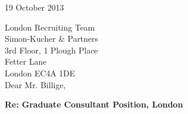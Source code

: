 \documentclass{../res}
\begin{document}
 
\begin{sloppypar}
 
 


\address{2115 Cloville Avenue\\
         Baltimore, MD 21214\\
         +1 443 257 5953}
\address{ryan.m.harrison@gmail.com\\
         linkedin.com/in/rmharri\\
         github.com/rmharrison}
\address{Wolfson College\\ 
         Oxford OX2 6UD\\
         +44 (0) 7523 229446}

\begin{resume} 
 
\vspace{2\baselineskip}

19 October 2013
\vspace{1\baselineskip}

London Recruiting Team \\
Simon-Kucher \& Partners \\
3rd Floor, 1 Plough Place \\
Fetter Lane \\
London EC4A 1DE \\

Dear Mr. Billige,

\textbf{Re: Graduate Consultant Position, London}


\end{resume}
\end{sloppypar}
\end{document}
